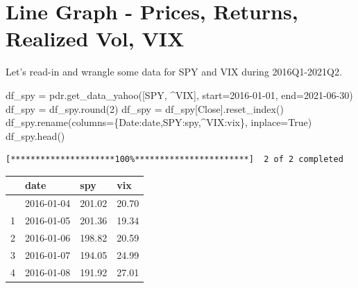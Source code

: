 \documentclass[
  letterpaper,
  DIV=11,
  numbers=noendperiod]{scrreprt}
\newenvironment{Shaded}{\begin{snugshade}}{\end{snugshade}}
\newcommand{\BuiltInTok}[1]{\textcolor[rgb]{0.00,0.23,0.31}{#1}}
\newcommand{\DecValTok}[1]{\textcolor[rgb]{0.68,0.00,0.00}{#1}}
\newcommand{\NormalTok}[1]{\textcolor[rgb]{0.00,0.23,0.31}{#1}}
\newcommand{\OperatorTok}[1]{\textcolor[rgb]{0.37,0.37,0.37}{#1}}
\newcommand{\StringTok}[1]{\textcolor[rgb]{0.13,0.47,0.30}{#1}}
\newcommand{\VariableTok}[1]{\textcolor[rgb]{0.07,0.07,0.07}{#1}}
\begin{document}
\hypertarget{line-graph---prices-returns-realized-vol-vix}{%
\section{Line Graph - Prices, Returns, Realized Vol,
VIX}\label{line-graph---prices-returns-realized-vol-vix}}

Let's read-in and wrangle some data for SPY and VIX during
2016Q1-2021Q2.

\begin{Shaded}
\begin{Highlighting}[]
\NormalTok{df\_spy }\OperatorTok{=}\NormalTok{ pdr.get\_data\_yahoo([}\StringTok{\textquotesingle{}SPY\textquotesingle{}}\NormalTok{, }\StringTok{\textquotesingle{}\^{}VIX\textquotesingle{}}\NormalTok{], start}\OperatorTok{=}\StringTok{\textquotesingle{}2016{-}01{-}01\textquotesingle{}}\NormalTok{, end}\OperatorTok{=}\StringTok{\textquotesingle{}2021{-}06{-}30\textquotesingle{}}\NormalTok{)}
\NormalTok{df\_spy }\OperatorTok{=}\NormalTok{ df\_spy.}\BuiltInTok{round}\NormalTok{(}\DecValTok{2}\NormalTok{)}
\NormalTok{df\_spy }\OperatorTok{=}\NormalTok{ df\_spy[}\StringTok{\textquotesingle{}Close\textquotesingle{}}\NormalTok{].reset\_index()}
\NormalTok{df\_spy.rename(columns}\OperatorTok{=}\NormalTok{\{}\StringTok{\textquotesingle{}Date\textquotesingle{}}\NormalTok{:}\StringTok{\textquotesingle{}date\textquotesingle{}}\NormalTok{,}\StringTok{\textquotesingle{}SPY\textquotesingle{}}\NormalTok{:}\StringTok{\textquotesingle{}spy\textquotesingle{}}\NormalTok{,}\StringTok{\textquotesingle{}\^{}VIX\textquotesingle{}}\NormalTok{:}\StringTok{\textquotesingle{}vix\textquotesingle{}}\NormalTok{\}, inplace}\OperatorTok{=}\VariableTok{True}\NormalTok{)}
\NormalTok{df\_spy.head()}
\end{Highlighting}
\end{Shaded}

\begin{verbatim}
[*********************100%***********************]  2 of 2 completed
\end{verbatim}

\begin{longtable}[]{@{}llll@{}}
\toprule\noalign{}
& date & spy & vix \\
\midrule\noalign{}
\endhead
\bottomrule\noalign{}
\endlastfoot
0 & 2016-01-04 & 201.02 & 20.70 \\
1 & 2016-01-05 & 201.36 & 19.34 \\
2 & 2016-01-06 & 198.82 & 20.59 \\
3 & 2016-01-07 & 194.05 & 24.99 \\
4 & 2016-01-08 & 191.92 & 27.01 \\
\end{longtable}
\end{document}
